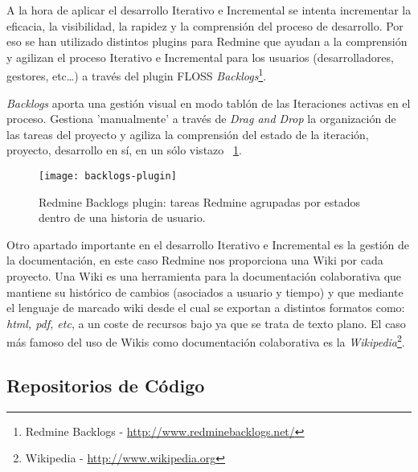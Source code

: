 \par A la hora de aplicar el desarrollo Iterativo e Incremental se intenta incrementar la eficacia, la visibilidad, la rapidez y la comprensión del proceso de desarrollo. Por eso se han utilizado distintos plugins para Redmine que ayudan a la comprensión y agilizan el proceso Iterativo e Incremental para los usuarios (desarrolladores, gestores, etc\ldots) a través del plugin FLOSS \emph{Backlogs}\footnote{Redmine Backlogs - \url{http://www.redminebacklogs.net/}}.

\par \emph{Backlogs} aporta una gestión visual en modo tablón de las Iteraciones activas en el proceso. Gestiona 'manualmente' a través de \emph{Drag and Drop} la organización de las tareas del proyecto y agiliza la comprensión del estado de la iteración, proyecto, desarrollo en sí, en un sólo vistazo ~\ref{fig:backlogs-plugin}.

\begin{figure}[H]
    \centering
    \texttt{[image: backlogs-plugin]}
    \caption{Redmine Backlogs plugin: tareas Redmine agrupadas por estados dentro de una historia de usuario.}
    \label{fig:backlogs-plugin}
\end{figure}

\par Otro apartado importante en el desarrollo Iterativo e Incremental es la gestión de la documentación, en este caso Redmine nos proporciona una Wiki por cada proyecto. Una Wiki es una herramienta para la documentación colaborativa que mantiene su histórico de cambios (asociados a usuario y tiempo) y que mediante el lenguaje de marcado wiki desde el cual se exportan a distintos formatos como: \emph{html, pdf, etc}, a un coste de recursos bajo ya que se trata de texto plano. El caso más famoso del uso de Wikis como documentación colaborativa es la \emph{Wikipedia}\footnote{Wikipedia - \url{http://www.wikipedia.org}}.




\subsection{Repositorios de Código}
\label{sub:repositorios}

